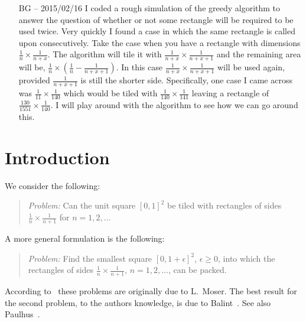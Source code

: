 \documentclass[11pt]{article}
\theoremstyle{plain}%
\theoremstyle{definition}
\theoremstyle{remark}
\numberwithin{equation}{section}
\begin{document}
\begin{itemize}
\item[BG -- 2015/02/16]
I coded a rough simulation of the greedy algorithm to answer the question of whether or not some rectangle will be required to be used twice. Very quickly I found a case in which the same rectangle is called upon consecutively. Take the case when you have a rectangle with dimensions $\frac{1}{n}\times\frac{1}{n+x}$. The algorithm will tile it with $\frac{1}{n+x}\times\frac{1}{n+x+1}$ and the remaining area will be, $\frac{1}{n}\times(\frac{1}{n}-\frac{1}{n+x+1})$. In this case $\frac{1}{n+x}\times\frac{1}{n+x+1}$ will be used again, provided $\frac{1}{n+x+1}$ is still the shorter side. Specifically, one case I came across was $\frac{1}{11}\times\frac{1}{140}$ which would be tiled with $\frac{1}{140}\times\frac{1}{141}$ leaving a rectangle of $\frac{130}{1551}\times\frac{1}{140}$. I will play around with the algorithm to see how we can go around this.
\end {itemize}


\newpage

\maketitle

\begin{abstract}
We consider the problem, originally due to L.\ Moser, of tiling the unit square with rectangles of side lengths $\frac{1}{n}\times\frac{1}{n+1}$ for $n=1,2,\ldots$.
This is the result of a University of Toronto Mentoring Program 2015.
\end{abstract}
\section{Introduction}
We consider the following:
\begin{quote}
{\it Problem:}
Can the unit square $[0,1]^2$ be tiled with rectangles of sides $\frac{1}{n}\times\frac{1}{n+1}$ for $n=1,2,\ldots$
\end{quote}
A more general formulation is the following:
\begin{quote}
{\it Problem:}
Find the smallest square $[0,1+\epsilon]^2$, $\epsilon\geq 0$, into which the rectangles of sides $\frac{1}{n}\times\frac{1}{n+1}$, $n=1,2,\ldots$, can be packed.
\end{quote}
According to~\cite[Section D11]{CFG94} these problems are originally due to L.\ Moser.
The best result for the second problem, to the authors knowledge, is due to Balint~\cite{Balint92, Balint98}. See also Paulhus~\cite{Paulhus98}.
\end{document}
